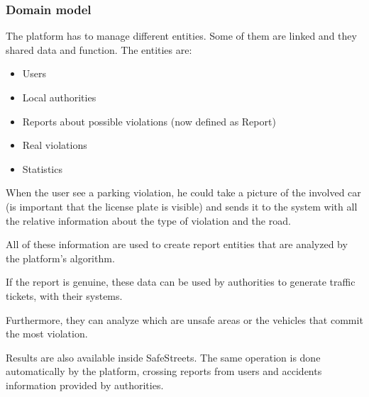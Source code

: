 \subsubsection{Domain model}

The platform has to manage different entities. Some of them are linked and they shared data and function.
The entities are: 
\begin{itemize}
\item Users
\item Local authorities
\item Reports about possible violations (now defined as Report)
\item Real violations
\item Statistics
\end{itemize}


When the user see a parking violation, he could take a picture of the involved car (is important that the license plate is visible) and sends it to the system with all the relative information about the type of violation and the road.

All of these information are used to create report entities that are analyzed by the platform’s algorithm.

If the report is genuine, these data can be used by authorities to generate traffic tickets, with their systems.

Furthermore, they can analyze which are unsafe areas or the vehicles that commit the most violation.

Results are also available inside SafeStreets.
The same operation is done automatically by the platform, crossing reports from users and accidents information provided by authorities.


